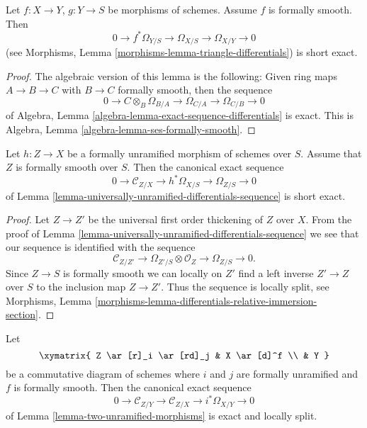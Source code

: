 \begin{lemma}
\label{lemma-triangle-differentials-formally-smooth}
Let $f : X \to Y$, $g : Y \to S$ be morphisms of schemes.
Assume $f$ is formally smooth. Then
$$
0 \to f^*\Omega_{Y/S} \to \Omega_{X/S} \to \Omega_{X/Y} \to 0
$$
(see
Morphisms, Lemma \ref{morphisms-lemma-triangle-differentials})
is short exact.
\end{lemma}

\begin{proof}
The algebraic version of this lemma is the following:
Given ring maps $A \to B \to C$ with $B \to C$ formally smooth, then
the sequence
$$
0 \to C \otimes_B \Omega_{B/A} \to \Omega_{C/A} \to \Omega_{C/B} \to 0
$$
of
Algebra, Lemma \ref{algebra-lemma-exact-sequence-differentials}
is exact. This is
Algebra, Lemma \ref{algebra-lemma-ses-formally-smooth}.
\end{proof}

\begin{lemma}
\label{lemma-differentials-formally-unramified-formally-smooth}
Let $h : Z \to X$ be a formally unramified morphism of schemes over $S$.
Assume that $Z$ is formally smooth over $S$. Then the
canonical exact sequence
$$
0 \to \mathcal{C}_{Z/X} \to h^*\Omega_{X/S} \to \Omega_{Z/S} \to 0
$$
of
Lemma \ref{lemma-universally-unramified-differentials-sequence}
is short exact.
\end{lemma}

\begin{proof}
Let $Z \to Z'$ be the universal first order thickening of $Z$ over $X$.
From the proof of
Lemma \ref{lemma-universally-unramified-differentials-sequence}
we see that our sequence is identified with the sequence
$$
\mathcal{C}_{Z/Z'} \to \Omega_{Z'/S} \otimes \mathcal{O}_Z \to
\Omega_{Z/S} \to 0.
$$
Since $Z \to S$ is formally smooth we can locally on $Z'$ find
a left inverse $Z' \to Z$ over $S$ to the inclusion map $Z \to Z'$.
Thus the sequence is locally split, see
Morphisms, Lemma \ref{morphisms-lemma-differentials-relative-immersion-section}.
\end{proof}

\begin{lemma}
\label{lemma-two-unramified-morphisms-formally-smooth}
Let
$$
\xymatrix{
Z \ar[r]_i \ar[rd]_j & X \ar[d]^f \\
& Y
}
$$
be a commutative diagram of schemes where $i$ and $j$ are formally
unramified and $f$ is formally smooth. Then the canonical exact sequence
$$
0 \to
\mathcal{C}_{Z/Y} \to
\mathcal{C}_{Z/X} \to
i^*\Omega_{X/Y} \to 0
$$
of
Lemma \ref{lemma-two-unramified-morphisms}
is exact and locally split.
\end{lemma}

